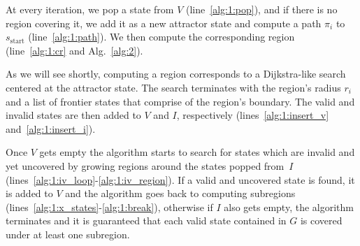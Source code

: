 \documentclass[letterpaper, 10 pt, conference]{ieeeconf}  %
\newcommand{\sStart}{\ensuremath{s_{\text{start}}\xspace}}
\begin{document}
At every iteration, we pop a state from $V$ (line~\ref{alg:1:pop}), and if there is no region covering it, we add it as a new attractor state and compute a path $\pi_i$ to $\sStart$ (line~\ref{alg:1:path}).
We then compute the corresponding region (line~\ref{alg:1:cr} and Alg.~\ref{alg:2}).

As we will see shortly, computing a region corresponds to a Dijkstra-like search centered at the attractor state.
The search terminates with the region's radius $r_i$ and a list of frontier states that comprise of the region's boundary.
The valid and invalid states are then added to $V$ and $I$, respectively (lines~\ref{alg:1:insert_v} and~\ref{alg:1:insert_i}).


Once $V$ gets empty the algorithm starts to search for states which are invalid and yet uncovered by growing regions around the states popped from~$I$ (lines~\ref{alg:1:iv_loop}-\ref{alg:1:iv_region}). If a valid and uncovered state is found, it is added to $V$ and the algorithm goes back to computing subregions (lines~\ref{alg:1:x_states}-\ref{alg:1:break}), otherwise if $I$ also gets empty, the algorithm terminates and it is guaranteed that each valid state contained in $G$ is covered under at least one subregion.

\end{document}
